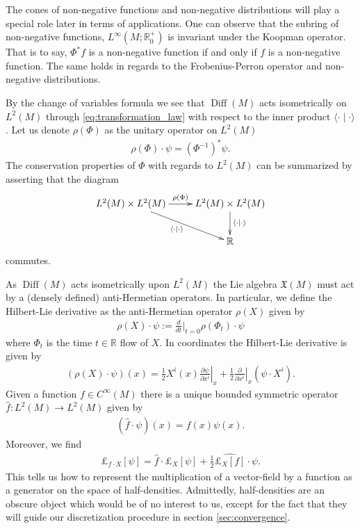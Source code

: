 \documentclass[12pt]{amsart}
\newcommand{\pder}[2]{\ensuremath{\frac{ \partial #1}{\partial #2}}}
\newcommand{\R}{\ensuremath{\mathbb{R}}}
\DeclareMathOperator{\Diff}{Diff}
\begin{document}
The cones of non-negative functions and non-negative distributions will play a special role later in terms of applications.
One can observe that the subring of non-negative functions, $L^\infty(M ; \R^+_0)$ is invariant under the Koopman operator.
That is to say, $\Phi^*f$ is a non-negative function if and only if $f$ is a non-negative function.
The same holds in regards to the Frobenius-Perron operator and non-negative distributions.

By the change of variables formula we see that $\Diff(M)$ acts isometrically on $L^2(M)$ through \eqref{eq:transformation_law} with respect to 
the inner product $\langle \cdot \mid \cdot \rangle$.
Let us denote $\rho(\Phi)$ as the unitary operator on $L^2(M)$
\begin{align*}
	\rho(\Phi) \cdot \psi = ( \Phi^{-1})^* \psi.
\end{align*}
The conservation properties of $\Phi$ with regards to $L^2(M)$ can be summarized by asserting that the diagram
\begin{equation*}
	\xymatrix{
		L^2(M) \times L^2(M) \ar[dr]_{\langle \cdot \mid \cdot \rangle} \ar[r]^{ \rho(\Phi)} & L^2(M) \times L^2(M) \ar[d]^{\langle \cdot \mid \cdot \rangle} \\
		&\mathbb{R}
	}
\end{equation*}
commutes.

As $\Diff(M)$ acts isometrically upon $L^2(M)$ the Lie algebra $\mathfrak{X}(M)$ must act by a (densely defined) anti-Hermetian operators.
In particular, we define the Hilbert-Lie derivative as the anti-Hermetian operator $\rho(X)$ given by
\begin{align*}
	\rho(X) \cdot \psi  := \frac{d}{dt} |_{t=0} \rho(\Phi_t) \cdot \psi
\end{align*}
where $\Phi_t$ is the time $t \in \R$ flow of $X$.
In coordinates the Hilbert-Lie derivative is given by
\begin{align*}
	\left(\rho(X) \cdot \psi \right)(x) = \frac{1}{2} X^i (x) \left.\pder{\psi}{x^i}\right|_{x}+ \frac{1}{2} \left.\pder{}{x^i}\right|_{x} \left(\psi \cdot X^i \right).
\end{align*}
Given a function $f \in C^\infty(M)$ there is a unique bounded symmetric operator $\hat{f} : L^2(M) \to L^2(M)$
given by
\begin{align}
	(\hat{f} \cdot \psi)(x) = f(x) \psi(x). \label{eq:function_op}
\end{align}
Moreover, we find
\begin{align}
	\pounds_{f\cdot X}[\psi] = \hat{f} \cdot \pounds_X[\psi] + \frac{1}{2} \widehat{\pounds_{X}[f] }\cdot \psi. \label{eq:module}
\end{align}
This tells us how to represent the multiplication of a vector-field by a function as a generator on the space of half-densities.
Admittedly, half-densities are an obscure object which would be of no interest to us, except for the fact that they will guide
our discretization procedure in section \ref{sec:convergence}.
\end{document}
